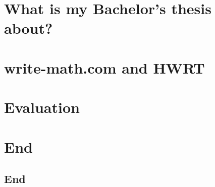 \documentclass[hyperref={pdfpagelabels=false},usepdftitle=false]{beamer}
\begin{document}

\title{\titleText}
\subtitle{Bachelor's thesis of Martin Thoma}
\author{\tutor}
\date{5th of June, 2014}

\frame{\titlepage}



\section{What is my Bachelor's thesis about?}


\section{write-math.com and HWRT}


% 
% 

\section{Evaluation}


% 

\section*{End}
\subsection{End}

\end{document}
